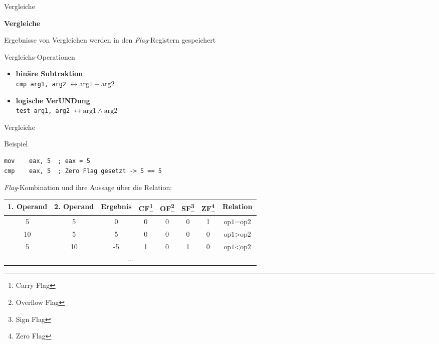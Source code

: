 \begin{frame}{Vergleiche}

\begin{center}
\textbf{Vergleiche}
\end{center}

Ergebnisse von Vergleichen werden in den \textit{Flag}-Registern gespeichert

\makebox{}

Vergleichs-Operationen
\begin{itemize}
    \item \textbf{binäre Subtraktion}\\
        \texttt{cmp arg1, arg2} $\leftrightarrow \text{arg1} - \text{arg2}$

    \item \textbf{logische VerUNDung}\\
        \texttt{test arg1, arg2} $\leftrightarrow \text{arg1} \wedge \text{arg2}$
\end{itemize}
\end{frame}

\begin{frame}[fragile]{Vergleiche}

Beispiel
\begin{lstlisting}
mov    eax, 5  ; eax = 5
cmp    eax, 5  ; Zero Flag gesetzt -> 5 == 5
\end{lstlisting}

\makebox{}

\textit{Flag}-Kombination und ihre Aussage über die Relation:

\makebox{}

\begin{small}
\begin{tabular}{|c|c|c|c|c|c|c|c|}
\hline
1. Operand & 2. Operand & Ergebnis &
CF\footnote{Carry Flag} &
OF\footnote{Overflow Flag} &
SF\footnote{Sign Flag} &
ZF\footnote{Zero Flag}
& Relation \\ \hline
5          & 5          & 0        & 0  & 0  & 0  & 1  & $\text{op1} = \text{op2}$ \\ \hline
10         & 5          & 5        & 0  & 0  & 0  & 0  & $\text{op1} > \text{op2}$ \\ \hline
5          & 10         & -5       & 1  & 0  & 1  & 0  & $\text{op1} < \text{op2}$ \\ \hline
\multicolumn{8}{|c|}{...} \\ \hline
\end{tabular}
\end{small}

\end{frame}

